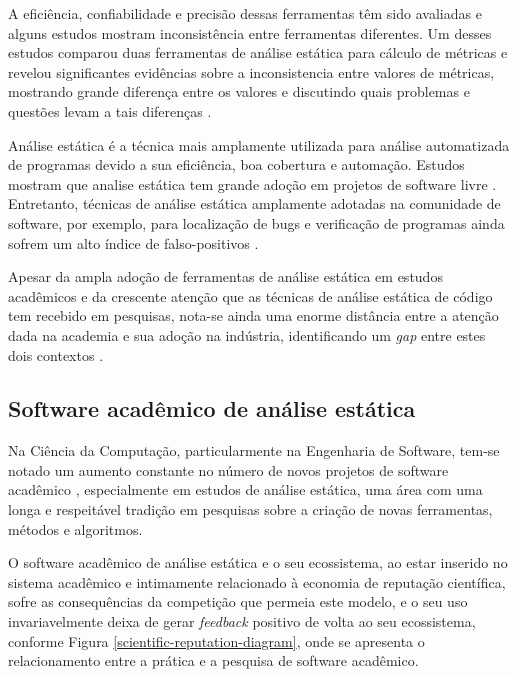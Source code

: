 A eficiência, confiabilidade e precisão dessas ferramentas têm sido avaliadas e
alguns estudos mostram inconsistência entre ferramentas diferentes.  Um desses
estudos comparou duas ferramentas de análise estática para cálculo de métricas
e revelou significantes evidências sobre a inconsistencia entre valores de
métricas, mostrando grande diferença entre os valores e discutindo quais
problemas e questões levam a tais diferenças \cite{alemerien2013experimental}.

Análise estática é a técnica mais amplamente utilizada para análise
automatizada de programas devido a sua eficiência, boa cobertura e automação.
Estudos mostram que analise estática tem grande adoção em projetos de software
livre \cite{beller2016analyzing}.
Entretanto, técnicas de análise estática amplamente adotadas na comunidade de software,
por exemplo, para localização de bugs e verificação de programas 
ainda sofrem um alto índice de falso-positivos \cite{gosain2015static}.

Apesar da ampla adoção de ferramentas de análise estática em estudos
acadêmicos e da crescente atenção que as técnicas de análise estática de código tem
recebido em pesquisas, nota-se ainda uma enorme distância entre a atenção dada na academia e sua adoção na indústria,
identificando um {\it gap} entre estes dois contextos \cite{ilyas2016static}.

\subsection{Software acadêmico de análise estática}

Na Ciência da Computação, particularmente na Engenharia de Software, tem-se
notado um aumento constante no número de novos projetos de software acadêmico \cite{allen2017engineering},
especialmente em estudos de análise estática, 
uma área com uma longa e respeitável tradição em
pesquisas sobre a criação de novas ferramentas, métodos e algoritmos.

O software acadêmico de análise estática e o seu ecossistema, ao estar inserido
no sistema acadêmico e intimamente relacionado à economia de reputação
científica, sofre as consequências da competição que permeia este modelo, e o
seu uso invariavelmente deixa de gerar {\it feedback} positivo de volta ao seu ecossistema,
conforme Figura \ref{scientific-reputation-diagram}, onde se apresenta o
relacionamento entre a prática e a pesquisa de software acadêmico.

